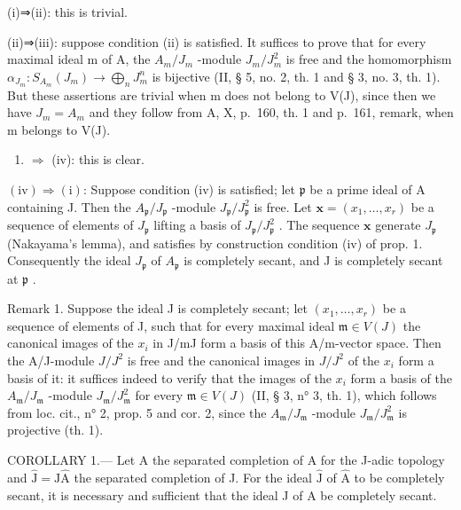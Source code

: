 (i)⇒(ii): this is trivial.

(ii)⇒(iii): suppose condition (ii) is satisfied. It suffices to prove that for every maximal ideal m of A, the \(A_{m}/J_{m}\) -module \(J_{m}/J_{m}^{2}\) is free and the homomorphism \(\alpha_{J_{m}}: S_{A_{m}}(J_{m}) \longrightarrow \bigoplus_{n} J_{m}^{n}\) is bijective (II, § 5, no. 2, th. 1 and § 3, no. 3, th. 1). But these assertions are trivial when m does not belong to V(J), since then we have \(J_{m} = A_{m}\) and they follow from A, X, p.~160, th. 1 and p.~161, remark, when m belongs to V(J).

\begin{enumerate}
\def\labelenumi{(\roman{enumi})}
\setcounter{enumi}{2}
\tightlist
\item
  \(\Rightarrow\) (iv): this is clear.
\end{enumerate}

\((\mathrm{iv}) \Rightarrow (\mathrm{i})\): Suppose condition (iv) is satisfied; let \(\mathfrak{p}\) be a prime ideal of A containing J. Then the \(A_{\mathfrak{p}} / J_{\mathfrak{p}}\) -module \(J_{\mathfrak{p}} / J_{\mathfrak{p}}^2\) is free. Let \(\mathbf{x} = (x_1, \ldots, x_r)\) be a sequence of elements of \(J_{\mathfrak{p}}\) lifting a basis of \(J_{\mathfrak{p}} / J_{\mathfrak{p}}^2\) . The sequence \(\mathbf{x}\) generate \(J_{\mathfrak{p}}\) (Nakayama's lemma), and satisfies by construction condition (iv) of prop. 1. Consequently the ideal \(J_{\mathfrak{p}}\) of \(A_{\mathfrak{p}}\) is completely secant, and J is completely secant at \(\mathfrak{p}\) .

Remark 1. Suppose the ideal J is completely secant; let \((x_1, \ldots, x_r)\) be a sequence of elements of J, such that for every maximal ideal \(\mathfrak{m} \in V(J)\) the canonical images of the \(x_i\) in J/mJ form a basis of this A/m-vector space. Then the A/J-module \(J/J^2\) is free and the canonical images in \(J/J^2\) of the \(x_i\) form a basis of it: it suffices indeed to verify that the images of the \(x_i\) form a basis of the \(A_{\mathfrak{m}}/J_{\mathfrak{m}}\) -module \(J_{\mathfrak{m}}/J_{\mathfrak{m}}^2\) for every \(\mathfrak{m} \in V(J)\) (II, § 3, n° 3, th. 1), which follows from loc. cit., n° 2, prop. 5 and cor. 2, since the \(A_{\mathfrak{m}}/J_{\mathfrak{m}}\) -module \(J_{\mathfrak{m}}/J_{\mathfrak{m}}^2\) is projective (th. 1).

COROLLARY 1.--- Let \(\widehat{\mathrm{A}}\) the separated completion of A for the J-adic topology and \(\widehat{\mathrm{J}} = \mathrm{J}\widehat{\mathrm{A}}\) the separated completion of J. For the ideal \(\widehat{\mathrm{J}}\) of \(\widehat{\mathrm{A}}\) to be completely secant, it is necessary and sufficient that the ideal J of A be completely secant.

